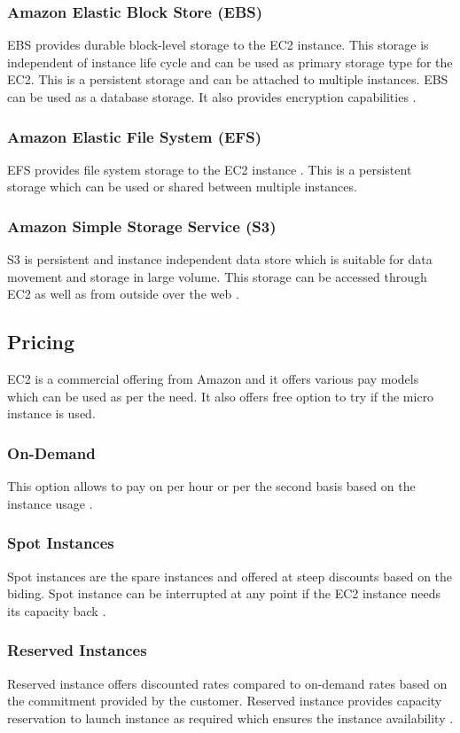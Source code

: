\subsubsection{Amazon Elastic Block Store (EBS)} 
EBS provides durable block-level storage to the EC2 instance. This storage is independent of instance life cycle and can be used as primary storage type for the EC2. This is a persistent storage and can be attached to multiple instances. EBS can be used as a database storage. It also provides encryption capabilities \cite{hid-sp18-402-www-aws-ec2Storage}.
\subsubsection{Amazon Elastic File System (EFS)} 
EFS provides file system storage to the EC2 instance \cite{hid-sp18-402-www-aws-ec2Storage}. This is a persistent storage which can be used or shared between multiple instances.
\subsubsection{Amazon Simple Storage Service (S3)} 
S3 is persistent and instance independent data store which is suitable for data movement and storage in large volume. This storage can be accessed through EC2 as well as from outside over the web \cite{hid-sp18-402-www-aws-ec2Storage}. 

\subsection{Pricing}
EC2 is a commercial offering from Amazon and it offers various pay models which can be used as per the need. It also offers free option to try if the micro instance is used.
\subsubsection{On-Demand} 
This option allows to pay on per hour or per the second basis based on the instance usage \cite{hid-sp18-402-www-aws-ec2Pricing}.
\subsubsection{Spot Instances} 
Spot instances are the spare instances and offered at steep discounts based on the biding. Spot instance can be interrupted at any point if the EC2 instance needs its capacity back \cite{hid-sp18-402-www-aws-ec2Pricing}.
\subsubsection{Reserved Instances} 
Reserved instance offers discounted rates compared to on-demand rates based on the commitment provided by the customer. Reserved instance provides capacity reservation to launch instance as required which ensures the instance availability \cite{hid-sp18-402-www-aws-ec2Pricing}.
